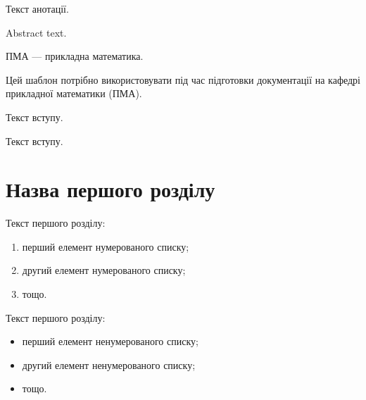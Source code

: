 \documentclass{dstu}
\begin{document}

\abstractUkr
Текст анотації.

\abstractEng
Abstract text.

\tableofcontents

\shortings
ПМА --- прикладна математика.

\intro
Цей шаблон потрібно використовувати під час підготовки документації на кафедрі прикладної математики (ПМА). 

Текст вступу.

Текст вступу.

\chapter{Назва першого розділу}
\label{chap:first}

Текст першого розділу:
\begin{enumerate}
	\item перший елемент нумерованого списку;
	\item другий елемент нумерованого списку;
	\item тощо.
\end{enumerate}

Текст першого розділу:
\begin{itemize}
	\item перший елемент ненумерованого списку;
	\item другий елемент ненумерованого списку;
	\item тощо.
\end{itemize}
\end{document}
